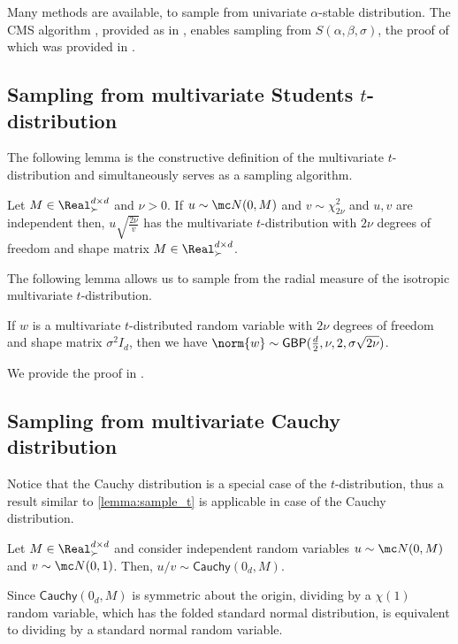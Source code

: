\documentclass{article}
\def\cite{\citep}
\theoremstyle{plain}
\begin{document}
Many methods are available, to sample from univariate $\alpha$-stable distribution. 
The CMS algorithm \cite{chambers1976method}, provided as  in , enables sampling from $S(\alpha, \beta, \sigma)$, the proof of which was provided in \cite{weron1996chambers}. 

\subsection{Sampling from multivariate Students \texorpdfstring{$t$}{t}-distribution}
The following lemma is the constructive definition of the multivariate $t$-distribution and simultaneously serves as a sampling algorithm.
\begin{lemma}\label{lemma:sample_t}
     Let $M\in\Real^{d\times d}_\succ$ and $\nu>0$. If ${u} \sim \mc N(0,M)$ and $v \sim \chi^2_{2\nu}$ and $u, v$ are independent then, $u \sqrt{\frac{{2\nu}}{v}}$ has the multivariate $t$-distribution with ${2\nu}$ degrees of freedom and shape matrix $M\in\Real^{d\times d}_{\succ}$.
\end{lemma}

The following lemma allows us to sample from the radial measure of the isotropic multivariate $t$-distribution.
\begin{lemma}\label{lemma:sample_norm_of_t}
If ${w}$ is a multivariate $t$-distributed random variable with $2\nu$ degrees of freedom and shape matrix $\sigma^2 I_d$, then we have $\norm{{w}}\sim\textsf{GBP}(\frac{d}{2}, \nu, 2, \sigma\sqrt{2\nu})$.
\end{lemma}
We provide the proof in .

\subsection{Sampling from multivariate Cauchy distribution}
Notice that the Cauchy distribution is a special case of the $t$-distribution, thus a result similar to \cref{lemma:sample_t} is applicable in case of the Cauchy distribution. 
\begin{lemma}\label{lemma:sample_cauchy}
    Let $M\in\Real^{d\times d}_\succ$ and consider independent random variables $u \sim \mc N(0,M)$ and $v \sim \mc N(0,1)$. Then, $u/v \sim \textsf{Cauchy}(0_d, M)$.
\end{lemma}
Since $\textsf{Cauchy}(0_d, M)$ is symmetric about the origin, dividing by a $\chi(1)$ random variable, which has the folded standard normal distribution, is equivalent to dividing by a standard normal random variable.
\end{document}
